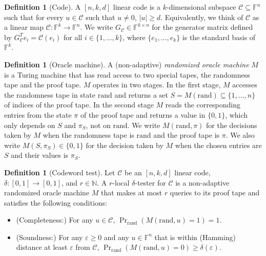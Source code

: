 \documentclass[11pt]{article}
\theoremstyle{definition}
\newtheorem{definition}[theorem]{Definition}
\newcommand{\code}{\mathcal{C}}
\newcommand{\field}{\mathbb{F}}
\newcommand{\N}{\ensuremath{\mathbb{N}}}
\newcommand{\ind}{\ensuremath{\mathrm{ind}}}
\newcommand{\rand}{\textrm{rand}}
\newcommand{\eps}{\varepsilon}
\begin{document}
\begin{definition}[Code]
A $[n,k,d]$ linear code is a $k$-dimensional subspace $\code\subseteq \field^n$ such that for every $u\in \code$ such that $u\neq 0$, $|u|\geq d$. Equivalently, we think of $\code$ as a linear map $\code:\field^k\to \field^n$. We write $G_\code \in \field^{k\times n}$ for the generator matrix defined by $ G_\code^T e_i =\code(e_i)$ for all $i\in\{1,\ldots,k\}$, where $\{e_1,\ldots,e_k\}$ is the standard basis of $\field^k$. 
\end{definition}


\begin{definition}[Oracle machine]
A (non-adaptive) \emph{randomized oracle machine} $M$ is a Turing machine that has read access to two special tapes, the randomness tape and the proof tape. $M$ operates in two stages. In the first stage, $M$ accesses the randomness tape in state $\rand$ and returns a set $S=M(\rand)\subseteq\{1,\ldots,n\}$ of  indices of the proof tape. In the second stage $M$ reads the corresponding entries from the state $\pi$ of the proof tape and returns a value in $\{0,1\}$, which only depends on $S$ and $\pi_S$, not on $\rand$. We write $M(\rand,\pi)$ for the decisions taken by $M$ when the randomness tape is $\rand$ and the proof tape is $\pi$. We also write $M(S,\pi_S)\in\{0,1\}$ for the decision taken by $M$ when the chosen entries are $S$ and their values is $\pi_S$.   
\end{definition}

\begin{definition}[Codeword test]
Let $\code$ be an $[n,k,d]$ linear code, $\delta:[0,1]\to[0,1]$, and $r\in \N$.
A $r$-local $\delta$-tester for $\code$ is a non-adaptive randomized oracle machine $M$ that makes at most $r$ queries to its proof tape and satisfies the following conditions:
\begin{itemize} 
\item (Completeness:) For any $u\in \code$, $\Pr_\rand( M(\rand,u)=1)=1$.
\item (Soundness:) For any $\eps\geq 0$ and any $u\in \field^n$ that is within (Hamming) distance at least  $\eps$ from $\code$, $\Pr_\rand(M(\rand,u)=0)\geq \delta(\eps)$. 
\end{itemize}
\end{definition}
\end{document}

